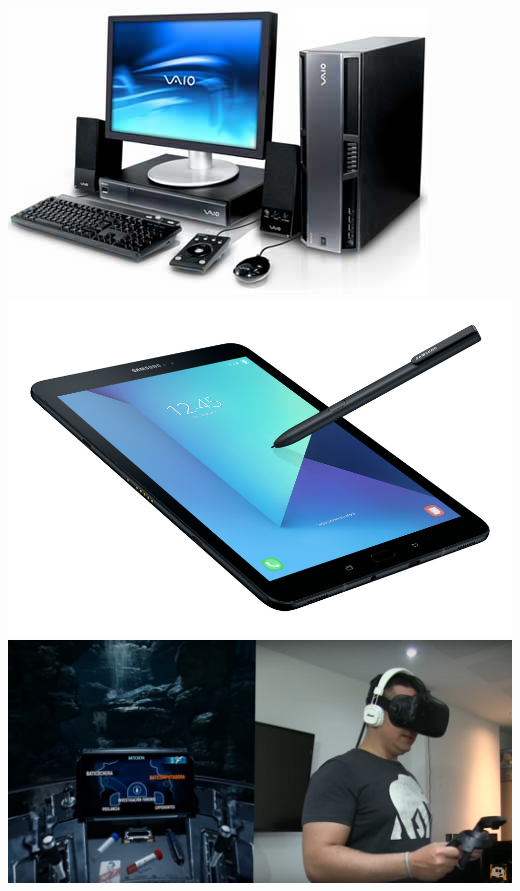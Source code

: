 \documentclass{beamer}
\begin{document}
\begin{frame}

\begin{center}
\includegraphics[scale = 0.25]{7_1.jpeg}
\vspace{0.5}
\includegraphics[scale = 0.1]{7_2.jpg} \\
\includegraphics[scale = 0.2]{7.png}
\end{center}
\end{frame}
\end{document}
